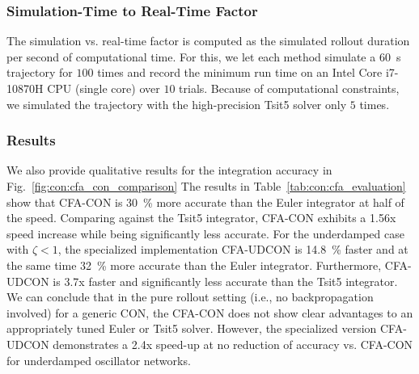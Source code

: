 \subsubsection{Simulation-Time to Real-Time Factor} 
The simulation vs. real-time factor is computed as the simulated rollout duration per second of computational time. For this, we let each method simulate a \SI{60}{s} trajectory for $100$ times and record the minimum run time on an Intel Core i7-10870H CPU (single core) over $10$ trials. Because of computational constraints, we simulated the trajectory  with the high-precision Tsit5 solver only $5$ times. 


\subsubsection{Results}
We also provide qualitative results for the integration accuracy in Fig.~\ref{fig:con:cfa_con_comparison}
The results in Table~\ref{tab:con:cfa_evaluation} show that \gls{CFA-CON} is \SI{30}{\percent} more accurate than the Euler integrator at half of the speed. Comparing against the Tsit5 integrator, \gls{CFA-CON} exhibits a 1.56x speed increase while being significantly less accurate.
For the underdamped case with $\zeta < 1$, the specialized implementation \gls{CFA-UDCON} is \SI{14.8}{\percent} faster and at the same time \SI{32}{\percent} more accurate than the Euler integrator. Furthermore, \gls{CFA-UDCON} is 3.7x faster and significantly less accurate than the Tsit5 integrator.
We can conclude that in the pure rollout setting (i.e., no backpropagation involved) for a generic \gls{CON}, the \gls{CFA-CON} does not show clear advantages to an appropriately tuned Euler or Tsit5 solver. However, the specialized version \gls{CFA-UDCON} demonstrates a 2.4x speed-up at no reduction of accuracy vs. \gls{CFA-CON} for underdamped oscillator networks.


